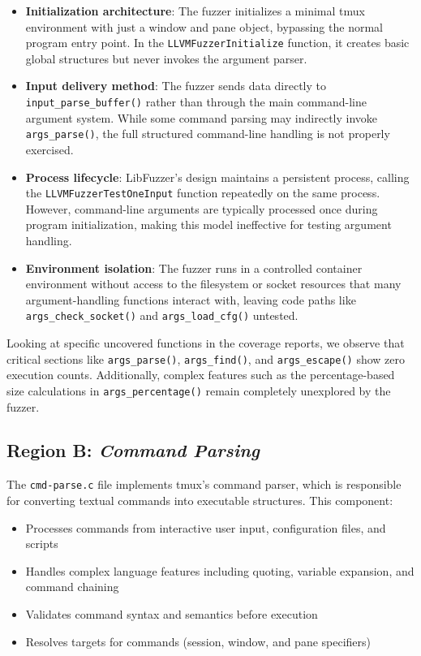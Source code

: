 \begin{itemize}
  \item \textbf{Initialization architecture}: The fuzzer initializes a minimal tmux environment with just a window and pane object, bypassing the normal program entry point. In the \texttt{LLVMFuzzerInitialize} function, it creates basic global structures but never invokes the argument parser.

  \item \textbf{Input delivery method}: The fuzzer sends data directly to \texttt{input\_parse\_buffer()} rather than through the main command-line argument system. While some command parsing may indirectly invoke \texttt{args\_parse()}, the full structured command-line handling is not properly exercised.

  \item \textbf{Process lifecycle}: LibFuzzer's design maintains a persistent process, calling the \texttt{LLVMFuzzerTestOneInput} function repeatedly on the same process. However, command-line arguments are typically processed once during program initialization, making this model ineffective for testing argument handling.

  \item \textbf{Environment isolation}: The fuzzer runs in a controlled container environment without access to the filesystem or socket resources that many argument-handling functions interact with, leaving code paths like \texttt{args\_check\_socket()} and \texttt{args\_load\_cfg()} untested.
\end{itemize}

Looking at specific uncovered functions in the coverage reports, we observe that critical sections like \texttt{args\_parse()}, \texttt{args\_find()}, and \texttt{args\_escape()} show zero execution counts. Additionally, complex features such as the percentage-based size calculations in \texttt{args\_percentage()} remain completely unexplored by the fuzzer.

\subsection*{Region B: \textit{Command Parsing}}

The \texttt{cmd-parse.c} file implements tmux's command parser, which is responsible for converting textual commands into executable structures. This component:

\begin{itemize}
  \item Processes commands from interactive user input, configuration files, and scripts
  \item Handles complex language features including quoting, variable expansion, and command chaining
  \item Validates command syntax and semantics before execution
  \item Resolves targets for commands (session, window, and pane specifiers)
\end{itemize}

